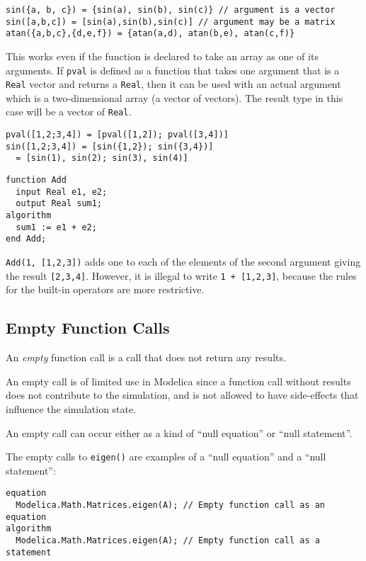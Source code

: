 \begin{example}
\begin{lstlisting}[language=modelica]
sin({a, b, c}) = {sin(a), sin(b), sin(c)} // argument is a vector
sin([a,b,c]) = [sin(a),sin(b),sin(c)] // argument may be a matrix
atan({a,b,c},{d,e,f}) = {atan(a,d), atan(b,e), atan(c,f)}
\end{lstlisting}
This works even if the function is declared to take an array as
one of its arguments. If \lstinline!pval! is defined as a function that takes
one argument that is a \lstinline!Real! vector and returns a \lstinline!Real!, then it can
be used with an actual argument which is a two-dimensional array (a
vector of vectors). The result type in this case will be a vector of
\lstinline!Real!.
\begin{lstlisting}[language=modelica]
pval([1,2;3,4]) = [pval([1,2]); pval([3,4])]
sin([1,2;3,4]) = [sin({1,2}); sin({3,4})]
  = [sin(1), sin(2); sin(3), sin(4)]
\end{lstlisting}
\begin{lstlisting}[language=modelica]
function Add
  input Real e1, e2;
  output Real sum1;
algorithm
  sum1 := e1 + e2;
end Add;
\end{lstlisting}
\lstinline!Add(1, [1,2,3])! adds one to each of the elements of the second
argument giving the result \lstinline![2,3,4]!. However, it is illegal to
write \lstinline!1 + [1,2,3]!, because the rules for the built-in
operators are more restrictive.
\end{example}

\subsection{Empty Function Calls}\label{empty-function-calls}

An \emph{empty} function call is a call that does not return any results.

\begin{nonnormative}
An empty call is of limited use in Modelica since a function call without results does not contribute to the simulation, and is not
allowed to have side-effects that influence the simulation state.
\end{nonnormative}

An empty call can occur either as a kind of ``null equation'' or ``null statement''.

\begin{example}
The empty calls to \lstinline!eigen()! are examples of a ``null equation'' and a ``null statement'':
\begin{lstlisting}[language=modelica]
equation
  Modelica.Math.Matrices.eigen(A); // Empty function call as an equation
algorithm
  Modelica.Math.Matrices.eigen(A); // Empty function call as a statement
\end{lstlisting}
\end{example}

